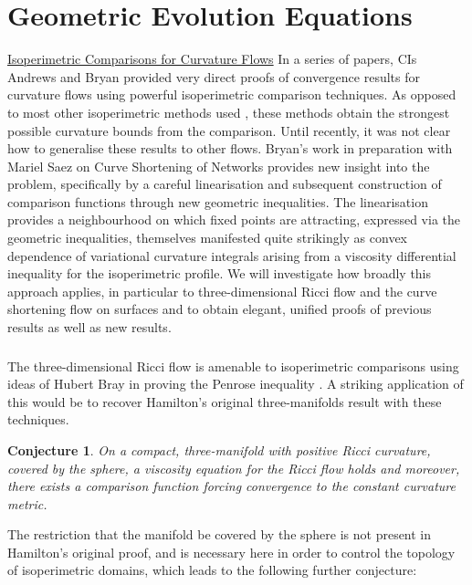 \documentclass[12pt]{article}
\author{Paul Bryan}
\date{}
\title{}
\newtheorem{Conjecture}[theorem]{Conjecture}
\begin{document}
\section*{Geometric Evolution Equations}
\label{sec:orgheadline1}

\underline{Isoperimetric Comparisons for Curvature Flows}
In a series of papers, CIs Andrews and Bryan provided very direct proofs of convergence results for curvature flows \cite{AB1, AB2, AB3, B1} using powerful isoperimetric comparison techniques. As opposed to most other isoperimetric methods used \cite{Ham1, Hu1, Ham2}, these methods obtain the strongest possible curvature bounds from the comparison. Until recently, it was not clear how to generalise these results to other flows. Bryan's work in preparation with Mariel Saez on Curve Shortening of Networks provides new insight into the problem, specifically by a careful linearisation and subsequent construction of comparison functions through new geometric inequalities. The linearisation provides a neighbourhood on which fixed points are attracting, expressed via the geometric inequalities, themselves manifested quite strikingly as convex dependence of variational curvature integrals arising from a viscosity differential inequality for the isoperimetric profile. We will investigate how broadly this approach applies, in particular to three-dimensional Ricci flow and the curve shortening flow on surfaces and to obtain elegant, unified proofs of previous results as well as new results.


\subsubsection*{}


The three-dimensional Ricci flow is amenable to isoperimetric comparisons using ideas of Hubert Bray in proving the Penrose inequality \cite{Br}. A striking application of this would be to recover Hamilton's original three-manifolds result with these techniques.

\begin{Conjecture}
On a compact, three-manifold with positive Ricci curvature, covered by the sphere, a viscosity equation for the Ricci flow holds and moreover, there exists a comparison function forcing convergence to the constant curvature metric.
\end{Conjecture}

The restriction that the manifold be covered by the sphere is not present in Hamilton's original proof, and is necessary here in order to control the topology of isoperimetric domains, which leads to the following further conjecture:
\end{document}
